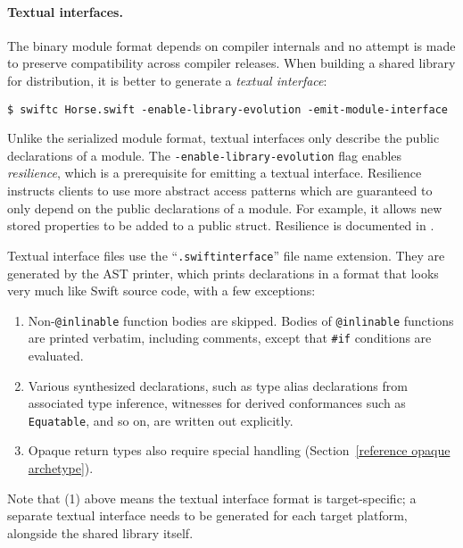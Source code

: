 \documentclass[../generics]{subfiles}
\begin{document}
\paragraph{Textual interfaces.} The binary module format depends on compiler internals and no attempt is made to preserve compatibility across compiler releases. When building a shared library for distribution, it is better to generate a \emph{textual interface}:
\begin{Verbatim}
$ swiftc Horse.swift -enable-library-evolution -emit-module-interface
\end{Verbatim}
Unlike the serialized module format, textual interfaces only describe the public declarations of a module. The \texttt{-enable-library-evolution} flag enables \emph{resilience}, which is a prerequisite for emitting a textual interface. Resilience instructs clients to use more abstract access patterns which are guaranteed to only depend on the public declarations of a module. For example, it allows new stored properties to be added to a public struct. Resilience is documented in \cite{libraryevolution}.

Textual interface files use the ``\texttt{.swiftinterface}'' file name extension. They are generated by the AST printer, which prints declarations in a format that looks very much like Swift source code, with a few exceptions:
\begin{enumerate}
\item Non-\texttt{@inlinable} function bodies are skipped. Bodies of \texttt{@inlinable} functions are printed verbatim, including comments, except that \verb|#if| conditions are evaluated.
\item Various synthesized declarations, such as type alias declarations from associated type inference, witnesses for derived conformances such as \texttt{Equatable}, and so on, are written out explicitly.
\item Opaque return types also require special handling (Section~\ref{reference opaque archetype}).
\end{enumerate}
Note that (1) above means the textual interface format is target-specific; a separate textual interface needs to be generated for each target platform, alongside the shared library itself.
\end{document}
